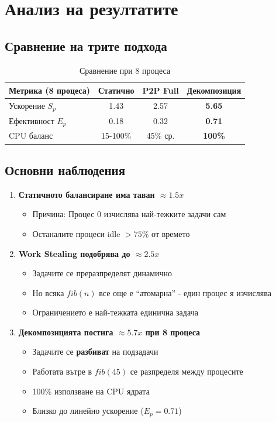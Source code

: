 \documentclass[12pt,a4paper]{article}
\begin{document}
\section{Анализ на резултатите}

\subsection{Сравнение на трите подхода}

\begin{table}[H]
\centering
\begin{tabular}{lccc}
\toprule
\textbf{Метрика (8 процеса)} & \textbf{Статично} & \textbf{P2P Full} & \textbf{Декомпозиция} \\
\midrule
Ускорение $S_p$ & 1.43 & 2.57 & \textbf{5.65} \\
Ефективност $E_p$ & 0.18 & 0.32 & \textbf{0.71} \\
CPU баланс & 15-100\% & 45\% ср. & \textbf{100\%} \\
\bottomrule
\end{tabular}
\caption{Сравнение при 8 процеса}
\end{table}

\subsection{Основни наблюдения}

\begin{enumerate}
    \item \textbf{Статичното балансиране има таван $\approx 1.5x$}
    \begin{itemize}
        \item Причина: Процес 0 изчислява най-тежките задачи сам
        \item Останалите процеси idle $>75\%$ от времето
    \end{itemize}

    \item \textbf{Work Stealing подобрява до $\approx 2.5x$}
    \begin{itemize}
        \item Задачите се преразпределят динамично
        \item Но всяка $fib(n)$ все още е ``атомарна'' - един процес я изчислява
        \item Ограничението е най-тежката единична задача
    \end{itemize}

    \item \textbf{Декомпозицията постига $\approx 5.7x$ при 8 процеса}
    \begin{itemize}
        \item Задачите се \textbf{разбиват} на подзадачи
        \item Работата вътре в $fib(45)$ се разпределя между процесите
        \item 100\% използване на CPU ядрата
        \item Близко до линейно ускорение ($E_p = 0.71$)
    \end{itemize}
\end{enumerate}
\end{document}
